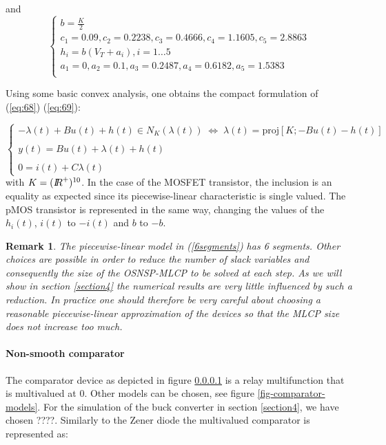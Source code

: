 \documentclass{article}
\newtheorem{remark}{Remark}
\begin{document}
and 
\begin{equation}
  \label{eq:70}
 \left\{ \begin{array}{l}
  b = \frac{K}{2} \\
  c_1 = 0.09 , c_2=0.2238 , c_3=0.4666 , c_4=1.1605 , c_5=2.8863 \\
  h_i = b(V_T+a_i), i =1\ldots 5 \\
  a_1 = 0 , a_2=0.1, a_3=0.2487 , a_4=0.6182 , a_5=1.5383 \\
\end{array}\right.
\end{equation}


Using some basic convex analysis, one obtains the compact formulation of (\ref{eq:68}) (\ref{eq:69}): 

\begin{equation}
\left\{\begin{array}{l}
-\lambda(t)+Bu(t)+h(t) \in N_{K}(\lambda(t))\; \Leftrightarrow  \;  \lambda(t)=\mbox{proj}[K; -Bu(t)-h(t)] \\ \\
y(t)=Bu(t)+\lambda(t)+h(t) \\ \\
0=i(t)+C\lambda(t)
\end{array}\right.
\end{equation}
with $K=(\mbox{\rm $I\!\!R$}^{+})^{10}$. In the case of the MOSFET transistor, the inclusion is an equality as expected since its piecewise-linear characteristic is single valued. The pMOS transistor is represented in the same way, changing the values of the $h_{i}(t)$, $i(t)$ to $-i(t)$ and $b$ to $-b$. 


\begin{remark}
The piecewise-linear model in (\ref{6segments}) has 6 segments. Other choices are possible in order to reduce the number of slack variables and consequently the size of the OSNSP-MLCP to be solved at each step. As we will show in section \ref{section4} the numerical results are very little influenced by such a reduction. In practice one should therefore be very careful about choosing a reasonable piecewise-linear approximation of the devices so that the MLCP size does not increase too much. 
\end{remark}




\paragraph{Non-smooth comparator} The comparator device as depicted in figure \ref{} is a relay multifunction that is multivalued at 0. Other models can be chosen, see figure \ref{fig-comparator-models}. For the simulation of the buck converter in section \ref{section4}, we have chosen ????. Similarly to the Zener diode the multivalued comparator is represented as:
\end{document}
